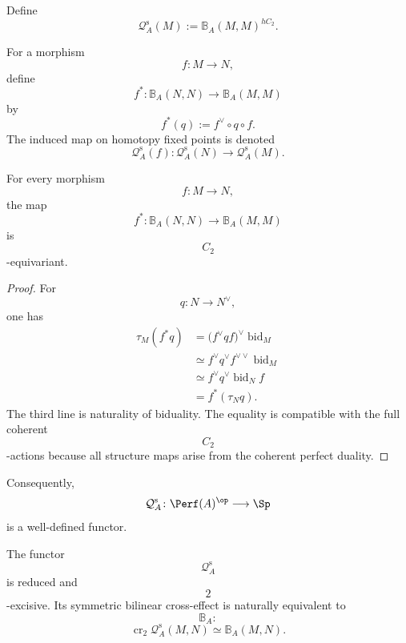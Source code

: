 \begin{definition}
\label{def:homotopy-symmetric-poincare-functor}
Define
\[
    \mathcal Q_A^{\mathrm s}(M)
    :=
    \mathbb B_A(M,M)^{hC_2}.
\]

For a morphism
\[
    f
    \colon
    M
    \longrightarrow
    N,
\]
define
\[
    f^*
    \colon
    \mathbb B_A(N,N)
    \longrightarrow
    \mathbb B_A(M,M)
\]
by
\[
    f^*(q)
    :=
    f^\vee
    \circ
    q
    \circ
    f.
\]
The induced map on homotopy fixed points is denoted
\[
    \mathcal Q_A^{\mathrm s}(f)
    \colon
    \mathcal Q_A^{\mathrm s}(N)
    \longrightarrow
    \mathcal Q_A^{\mathrm s}(M).
\]
\end{definition}

\begin{lemma}
\label{lem:poincare-pullback-equivariant}
For every morphism
\[
    f
    \colon
    M
    \longrightarrow
    N,
\]
the map
\[
    f^*
    \colon
    \mathbb B_A(N,N)
    \longrightarrow
    \mathbb B_A(M,M)
\]
is
\[
    C_2
\]
-equivariant.
\end{lemma}

\begin{proof}
For
\[
    q
    \colon
    N
    \longrightarrow
    N^\vee,
\]
one has
\[
\begin{aligned}
    \tau_M(f^*q)
    &=
    \bigl(
        f^\vee
        q
        f
    \bigr)^\vee
    \operatorname{bid}_M
    \\
    &\simeq
    f^\vee
    q^\vee
    f^{\vee\vee}
    \operatorname{bid}_M
    \\
    &\simeq
    f^\vee
    q^\vee
    \operatorname{bid}_N
    f
    \\
    &=
    f^*(\tau_Nq).
\end{aligned}
\]
The third line is naturality of biduality. The equality is compatible with
the full coherent
\[
    C_2
\]
-actions because all structure maps arise from the coherent perfect
duality.
\end{proof}

Consequently,
\[
    \mathcal Q_A^{\mathrm s}
    \colon
    \Perf(A)^{\op}
    \longrightarrow
    \Sp
\]
is a well-defined functor.

\begin{proposition}
\label{prop:homotopy-symmetric-cross-effect}
The functor
\[
    \mathcal Q_A^{\mathrm s}
\]
is reduced and
\[
    2
\]
-excisive. Its symmetric bilinear cross-effect is naturally equivalent to
\[
    \mathbb B_A:
\]
\[
    \operatorname{cr}_2
    \mathcal Q_A^{\mathrm s}(M,N)
    \simeq
    \mathbb B_A(M,N).
\]
\end{proposition}

